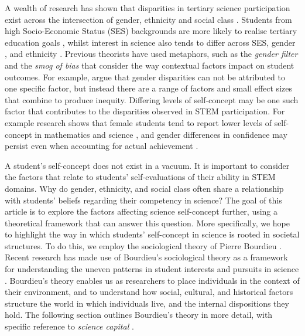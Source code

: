 A wealth of research has shown that disparities in tertiary science participation exist across the intersection of gender, ethnicity and social class \citep{reynolds2011change,meehan2017explaining}. Students from high Socio-Economic Status (SES) backgrounds are more likely to realise tertiary education goals \citep{reynolds2011change}, whilst interest in science also tends to differ across SES, gender \citep{cheryan2017some}, and ethnicity \citep{Wong2016ScienceStudents}. Previous theorists have used metaphors, such as the \textit{gender filter} \citep{Blickenstaff_2005} and the \textit{smog of bias} \citep{Kost_Smith_2010} that consider the way contextual factors impact on student outcomes. For example, \cite{Kost_Smith_2010} argue that gender disparities can not be attributed to one specific factor, but instead there are a range of factors and small effect sizes that combine to produce inequity. Differing levels of self-concept may be one such factor that contributes to the disparities observed in STEM participation. For example research shows that female students tend to report lower levels of self-concept in mathematics and science \citep{Else-Quest2013}, and gender differences in confidence may persist even when accounting for actual achievement \citep{Ellis_2016}.

A student's self-concept does not exist in a vacuum. It is important to consider the factors that relate to students' self-evaluations of their ability in STEM domains. Why do gender, ethnicity, and social class often share a relationship with students' beliefs regarding their competency in science? The goal of this article is to explore the factors affecting science self-concept further, using a theoretical framework that can answer this question. More specifically, we hope to highlight the way in which students' self-concept in science is rooted in societal structures. To do this, we employ the sociological theory of Pierre Bourdieu \citep{Bourdieu1984}. Recent research has made use of Bourdieu's sociological theory as a framework for understanding the uneven patterns in student interests and pursuits in science \citep{archer2013aspires,Archer_2015,turnbull2019bourdieu}. Bourdieu's theory enables us as researchers to place individuals in the context of their environment, and to understand how social, cultural, and historical factors structure the world in which individuals live, and the internal dispositions they hold. The following section outlines Bourdieu's theory in more detail, with specific reference to \textit{science capital} \citep{Archer_2015}.

